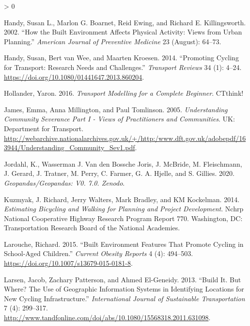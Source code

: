 \documentclass[galley]{jtlu-article-2col}
\newlength{\cslhangindent}
\newenvironment{CSLReferences}[2] %
 {%
  \setlength{\parindent}{0pt}
  \ifodd #1 \everypar{\setlength{\hangindent}{\cslhangindent}}\ignorespaces\fi
  \ifnum #2 > 0
  \setlength{\parskip}{#2\baselineskip}
  \fi
 }%
 {}
\begin{document}
\begin{CSLReferences}{1}{0}
\leavevmode\hypertarget{ref-handy_how_2002}{}%
Handy, Susan L., Marlon G. Boarnet, Reid Ewing, and Richard E. Killingsworth. 2002. {``How the Built Environment Affects Physical Activity: Views from Urban Planning.''} \emph{American Journal of Preventive Medicine} 23 (August): 64--73.

\leavevmode\hypertarget{ref-handy_promoting_2014}{}%
Handy, Susan, Bert van Wee, and Maarten Kroesen. 2014. {``Promoting {Cycling} for {Transport}: {Research Needs} and {Challenges}.''} \emph{Transport Reviews} 34 (1): 4--24. \url{https://doi.org/10.1080/01441647.2013.860204}.

\leavevmode\hypertarget{ref-hollander_transport_2016}{}%
Hollander, Yaron. 2016. \emph{Transport {Modelling} for a {Complete Beginner}}. {CTthink!}

\leavevmode\hypertarget{ref-james_understanding_2005}{}%
James, Emma, Anna Millington, and Paul Tomlinson. 2005. \emph{Understanding Community Severance Part {I} - Views of Practitioners and Communities}. {UK}: {Department for Transport}. \url{http://webarchive.nationalarchives.gov.uk/+/http:/www.dft.gov.uk/adobepdf/163944/Understanding_Community_Sev1.pdf}.

\leavevmode\hypertarget{ref-jordahl_geopandas_2020}{}%
Jordahl, K., Wasserman J. Van den Bossche Joris, J. McBride, M. Fleischmann, J. Gerard, J. Tratner, M. Perry, C. Farmer, G. A. Hjelle, and S. Gillies. 2020. \emph{Geopandas/Geopandas: {V0}. 7.0. {Zenodo}}.

\leavevmode\hypertarget{ref-kuzmyak_estimating_2014}{}%
Kuzmyak, J. Richard, Jerry Walters, Mark Bradley, and KM Kockelman. 2014. \emph{Estimating Bicycling and Walking for Planning and Project Development}. Nchrp National Cooperative Highway Research Program Report 770. {Washington, DC}: {Transportation Research Board of the National Academies}.

\leavevmode\hypertarget{ref-larouche_built_2015}{}%
Larouche, Richard. 2015. {``Built {Environment Features} That {Promote Cycling} in {School}-{Aged Children}.''} \emph{Current Obesity Reports} 4 (4): 494--503. \url{https://doi.org/10.1007/s13679-015-0181-8}.

\leavevmode\hypertarget{ref-larsen_build_2013}{}%
Larsen, Jacob, Zachary Patterson, and Ahmed El-Geneidy. 2013. {``Build It. {But} Where? {The} Use of Geographic Information Systems in Identifying Locations for New Cycling Infrastructure.''} \emph{International Journal of Sustainable Transportation} 7 (4): 299--317. \url{http://www.tandfonline.com/doi/abs/10.1080/15568318.2011.631098}.


\end{CSLReferences}
\end{document}
